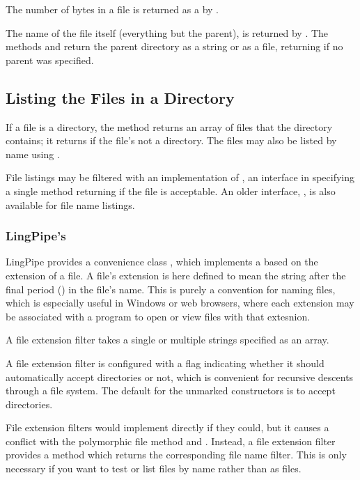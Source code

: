 The number of bytes in a file is returned as a  by
.

The name of the file itself (everything but the parent), is returned
by .  The methods  and
 return the parent directory as a string or as a
file, returning  if no parent was specified.

\subsection{Listing the Files in a Directory}

If a file is a directory, the method  returns an
array of files that the directory contains; it returns 
if the file's not a directory.  The files may also be listed
by name using . 

File listings may be filtered with an implementation of
, an interface in  specifying a single
method  returning  if the file is
acceptable.  An older interface, , is also
available for file name listings.


\subsubsection{LingPipe's }

LingPipe provides a convenience class , which
implements a  based on the extension of a file.  A
file's extension is here defined to mean the string after the final
period () in the file's name.  This is purely a convention for
naming files, which is especially useful in Windows or web browsers,
where each extension may be associated with a program to open or view
files with that extesnion.

A file extension filter takes a single or multiple strings
specified as an array.

A file extension filter is configured with a flag indicating
whether it should automatically accept directories or not, which
is convenient for recursive descents through a file system.  The
default for the unmarked constructors is to accept directories.

File extension filters would implement 
directly if they could, but it causes a conflict with the
polymorphic file method  and
.  Instead, a file extension filter
provides a method  which returns the
corresponding file name filter.  This is only necessary if you want to
test or list files by name rather than as files.

